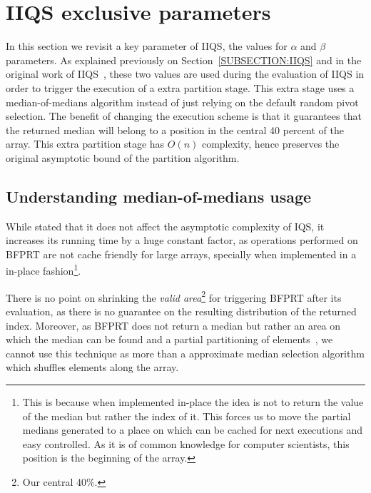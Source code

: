 \section{IIQS exclusive parameters}

In this section we revisit a key parameter of IIQS, the values for $\alpha$ and $\beta$ parameters. As explained previously on Section~\ref{SUBSECTION:IIQS} and in the original work of IIQS~\cite{7416566}, these two values are used during the evaluation of IIQS in order to trigger the execution of a extra partition stage. This extra stage uses a median-of-medians algorithm instead of just relying on the default random pivot selection. The benefit of changing the execution scheme is that it guarantees that the returned median will belong to a position in the central 40 percent of the array.  This extra partition stage has $O(n)$ complexity, hence preserves the original asymptotic bound of the partition algorithm.

\subsection{Understanding median-of-medians usage}
While stated that it does not affect the asymptotic complexity of IQS, it increases its running time by a huge constant factor, as operations performed on BFPRT are not cache friendly for large arrays, specially when implemented in a in-place fashion\footnote{This is because when implemented in-place the idea is not to return the value of the median but rather the index of it. This forces us to move the partial medians generated to a place on which can be cached for next executions and easy controlled. As it is of common knowledge for computer scientists, this position is the beginning of the array.}. 

There is no point on shrinking the \emph{valid area}\footnote{Our central 40\%.} for triggering BFPRT after its evaluation, as there is no guarantee on the resulting distribution of the returned index. Moreover, as BFPRT does not return a median but rather an area on which the median can be found and a partial partitioning of elements~\cite{Blum_Floyd_Pratt_Rivest_Tarjan_1973}, we cannot use this technique as more than a approximate median selection algorithm which shuffles elements along the array.


